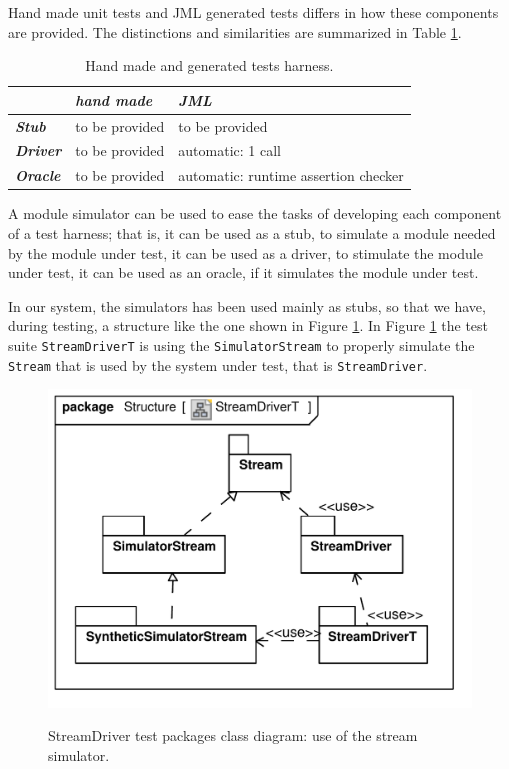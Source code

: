 \documentclass{article} \usepackage{times}
\newcommand{\lil}[1]{\texttt{\lstinline|#1|}}
\begin{document}
Hand made unit tests and JML generated tests differs in how these
components are provided.  The distinctions and similarities are
summarized in Table \ref{tab:test_harness}.

\begin{table}[htbp]
  \caption{Hand made and generated tests harness.}
  \label{tab:test_harness}
  \begin{center}
    \begin{tabular}{|l|l|l|}\hline
      & \textbf{\textit{hand made}} & \textbf{\textit{JML}} \\\hline
      \textbf{\textit{Stub}} & to be provided & to be provided\\\hline
      \textbf{\textit{Driver}} & to be provided & automatic: 1 call\\\hline
      \textbf{\textit{Oracle}} & to be provided & 
      automatic: runtime assertion checker\\\hline
    \end{tabular}
  \end{center}
\end{table}

A module simulator can be used to ease the tasks of developing each
component of a test harness; that is, it can be used as a stub, to
simulate a module needed by the module under test, it can be used as a
driver, to stimulate the module under test, it can be used as an
oracle, if it simulates the module under test.

In our system, the simulators has been used mainly as stubs, so that
we have, during testing, a structure like the one shown in Figure
\ref{fig:class_diagram_streamdriver_test}.  In Figure
\ref{fig:class_diagram_streamdriver_test} the test suite
\lil{StreamDriverT} is using the \lil{SimulatorStream} to properly
simulate the \lil{Stream} that is used by the system under test, that
is \lil{StreamDriver}.

\begin{figure}[htb!]
  \centering
  \includegraphics[scale=0.4]{UML_model/Class_Diagram__Structure__StreamDriverT}
  \label{fig:class_diagram_streamdriver_test}
  \caption{StreamDriver test packages class diagram: use of the stream
    simulator.}
\end{figure}
\end{document}
